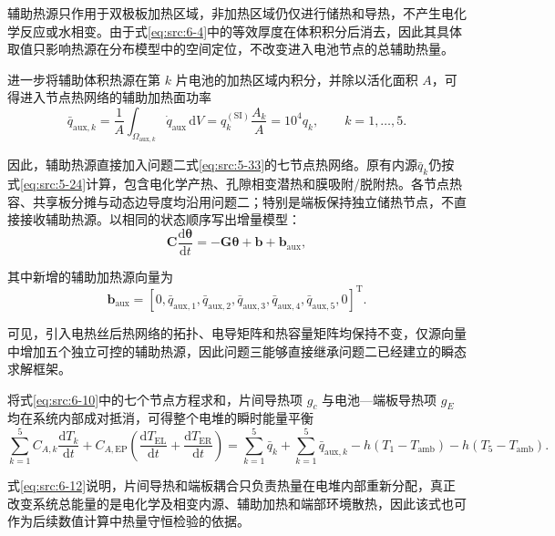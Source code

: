 \documentclass[bwprint]{gmcmthesis}
\numberwithin{equation}{section}
\numberwithin{figure}{section}
\begin{document}
 辅助热源只作用于双极板加热区域，非加热区域仍仅进行储热和导热，不产生电化学反应或水相变。由于式\eqref{eq:src:6-4}中的等效厚度在体积积分后消去，因此其具体取值只影响热源在分布模型中的空间定位，不改变进入电池节点的总辅助热量。

 进一步将辅助体积热源在第 \(k\) 片电池的加热区域内积分，并除以活化面积 \(A\)，可得进入节点热网络的辅助加热面功率
\begin{equation}
\bar{q}_{\text{aux},k} = \frac{1}{A} \int_{\Omega_{\text{aux},k}} \dot{q}_{\text{aux}} \, \mathrm{d}V = q_k^{(\text{SI})} \frac{A_k}{A} = 10^4 q_k, \qquad k = 1, \dots, 5. \label{eq:src:6-6}
\end{equation}

 因此，辅助热源直接加入问题二式\eqref{eq:src:5-33}的七节点热网络。原有内源$\bar q_k$仍按式\eqref{eq:src:5-24}计算，包含电化学产热、孔隙相变潜热和膜吸附/脱附热。各节点热容、共享板分摊与动态边导度均沿用问题二；特别是端板保持独立储热节点，不直接接收辅助热源。以相同的状态顺序写出增量模型：
\begin{equation}
\mathbf{C} \frac{\text{d}\boldsymbol{\theta}}{\text{d}t} = -\mathbf{G}\boldsymbol{\theta} + \mathbf{b} + \mathbf{b}_{\text{aux}}, \label{eq:src:6-10}
\end{equation}

 其中新增的辅助加热源向量为
\begin{equation}
\mathbf{b}_{\text{aux}} = [0, \bar{q}_{\text{aux},1}, \bar{q}_{\text{aux},2}, \bar{q}_{\text{aux},3}, \bar{q}_{\text{aux},4}, \bar{q}_{\text{aux},5}, 0]^{\text{T}}. \label{eq:src:6-11}
\end{equation}

 可见，引入电热丝后热网络的拓扑、电导矩阵和热容量矩阵均保持不变，仅源向量中增加五个独立可控的辅助热源，因此问题三能够直接继承问题二已经建立的瞬态求解框架。


 将式\eqref{eq:src:6-10}中的七个节点方程求和，片间导热项 \(g_c\) 与电池—端板导热项 \(g_E\) 均在系统内部成对抵消，可得整个电堆的瞬时能量平衡
\begin{equation}
\sum_{k=1}^5 C_{A,k} \frac{\text{d}T_k}{\text{d}t} + C_{A,\text{EP}} \left( \frac{\text{d}T_{\text{EL}}}{\text{d}t} + \frac{\text{d}T_{\text{ER}}}{\text{d}t} \right) = \sum_{k=1}^5 \bar{q}_k + \sum_{k=1}^5 \bar{q}_{\text{aux},k} - h(T_1 - T_{\text{amb}}) - h(T_5 - T_{\text{amb}}). \label{eq:src:6-12}
\end{equation}

 式\eqref{eq:src:6-12}说明，片间导热和端板耦合只负责热量在电堆内部重新分配，真正改变系统总能量的是电化学及相变内源、辅助加热和端部环境散热，因此该式也可作为后续数值计算中热量守恒检验的依据。
\end{document}
